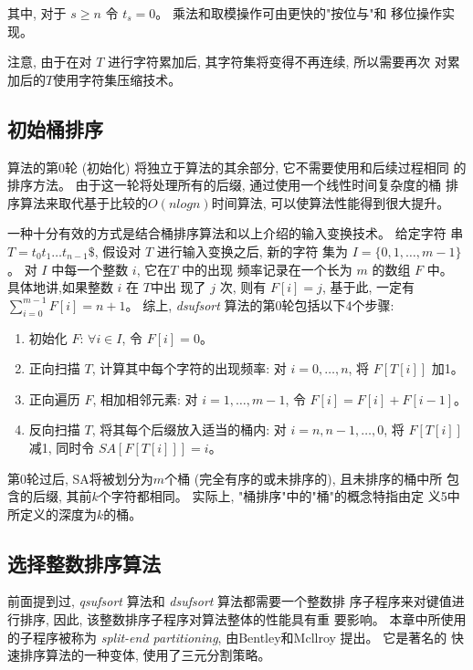 \noindent
其中, 对于 $s \geq n$ 令 $t_s = 0$。 乘法和取模操作可由更快的"按位与"和
移位操作实现。

注意, 由于在对 $T$ 进行字符累加后, 其字符集将变得不再连续, 所以需要再次
对累加后的$T$使用字符集压缩技术。

\subsection{初始桶排序}

算法的第0轮 (初始化) 将独立于算法的其余部分, 它不需要使用和后续过程相同
的排序方法。 由于这一轮将处理所有的后缀, 通过使用一个线性时间复杂度的桶
排序算法来取代基于比较的$O(nlogn)$时间算法, 可以使算法性能得到很大提升。

一种十分有效的方式是结合桶排序算法和以上介绍的输入变换技术。 给定字符
串 $T = t_0t_1 \dots t_{n-1}\$$, 假设对 $T$ 进行输入变换之后, 新的字符
集为 $I = \{0,1,\dots,m-1\}$。 对 $I$ 中每一个整数 $i$, 它在$T$ 中的出现
频率记录在一个长为 $m$ 的数组 $F$ 中。 具体地讲,如果整数 $i$ 在 $T$中出
现了 $j$ 次, 则有 $F[i] = j$, 基于此, 一定有 $\sum_{i=0}^{m-1} F[i] =
n + 1$。 综上, \emph{dsufsort} 算法的第0轮包括以下4个步骤:

\begin{enumerate}
\item 初始化 $F$: $\forall i \in I$, 令 $F[i] = 0$。
\item 正向扫描 $T$, 计算其中每个字符的出现频率: 对 $i =
  0,\dots,n$, 将 $F[T[i]]$ 加1。
\item 正向遍历 $F$, 相加相邻元素: 对 $i = 1, \dots, m-1$, 令 $F[i] =
  F[i] + F[i-1]$。
\item 反向扫描 $T$, 将其每个后缀放入适当的桶内: 对 $i = n, n-1,\dots,
  0$, 将 $F[T[i]]$ 减1, 同时令 $SA[F[T[i]]] = i$。
\end{enumerate}

第0轮过后, SA将被划分为$m$个桶 (完全有序的或未排序的), 且未排序的桶中所
包含的后缀, 其前$k$个字符都相同。 实际上, "桶排序"中的"桶"的概念特指由定
义5中所定义的深度为$k$的桶。

\subsection{选择整数排序算法}

前面提到过, \emph{qsufsort} 算法和 \emph{dsufsort} 算法都需要一个整数排
序子程序来对键值进行排序, 因此, 该整数排序子程序对算法整体的性能具有重
要影响。 本章中所使用的子程序被称为 \emph{split-end
  partitioning}, 由Bentley和Mcllroy\cite{Bentley1993} 提出。 它是著名的
快速排序算法\cite{Hoare1962}的一种变体, 使用了三元分割策略。

